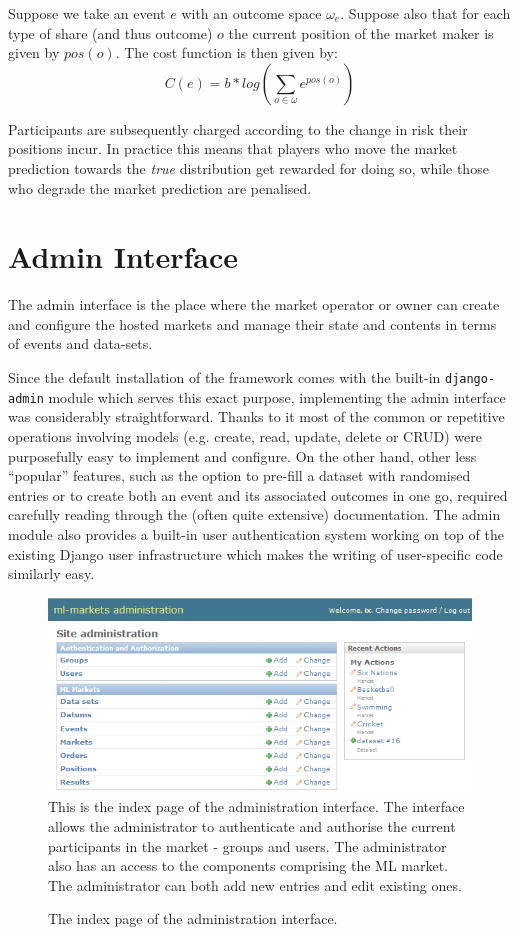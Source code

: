 \documentclass[bsc,frontabs,twoside,singlespacing,parskip,deptreport]{infthesis}     %
\begin{document}
	Suppose we take an event $e$ with an outcome space $\omega_e$. Suppose also that for each type of share (and thus outcome) $o$ the current position of the market maker is given by $pos(o)$. The cost function is then given by:
$$C(e)=b*log(\sum_{o \in \omega} {e^{pos(o)}})$$

	Participants are subsequently charged according to the change in risk their positions incur. In practice this means that players who move the market prediction towards the {\it true} distribution get rewarded for doing so, while those who degrade the market prediction are penalised.

	


\section{Admin Interface}


    The admin interface is the place where the market operator or owner can create and configure the hosted markets and manage their state and contents in terms of events and data-sets.

    Since the default installation of the framework comes with the built-in {\tt django-admin} module which serves this exact purpose, implementing the admin interface was considerably straightforward. Thanks to it most of the common or repetitive operations involving models (e.g. create, read, update, delete or CRUD) were purposefully easy to implement and configure. On the other hand, other less ``popular'' features, such as the option to pre-fill a dataset with randomised entries or to create both an event and its associated outcomes in one go, required carefully reading through the (often quite extensive) documentation. The admin module also provides a built-in user authentication system working on top of the existing Django user infrastructure which makes the writing of user-specific code similarly easy. 

\begin{figure}
 \caption{The index page of the administration interface. }
  \includegraphics[width=\textwidth]{figures/admin-index(c).png}
   \label{fig:admin-index}
{This is the index page of the administration interface. The interface allows the administrator to authenticate and authorise the current participants in the market -  groups and users. The administrator also has an access to the components comprising the ML market. The administrator can both add new entries and edit existing ones.}
\end{figure}
\end{document}
